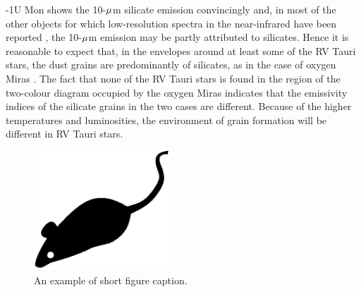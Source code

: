 \documentclass[useAMS,usenatbib]{biom}
\begin{document}
\looseness-1U Mon shows the 10-$\mu$m silicate emission convincingly and, in
most of the other objects for which low-resolution spectra in the
near-infrared have been reported \citep{b5,b19}, the 10-$\mu$m
emission may be partly attributed to silicates. Hence it is
reasonable to expect that, in the envelopes around at least some
of the RV Tauri stars, the dust grains are predominantly of
silicates, as in the case of oxygen Miras \citep{b21}. The fact
that none of the RV Tauri stars is found in the region of the
two-colour diagram occupied by the oxygen Miras indicates that the
emissivity indices of the silicate grains in the two cases are
different. Because of the higher temperatures and luminosities,
the environment of grain formation will be different in RV Tauri
stars.
\begin{figure}[b]
  \centerline{\includegraphics[width=2in]{mouse.eps}}
  \caption{An example of short figure caption.}
\vspace*{-3pt}
\label{f:shortmouse}
\end{figure}
\end{document}
